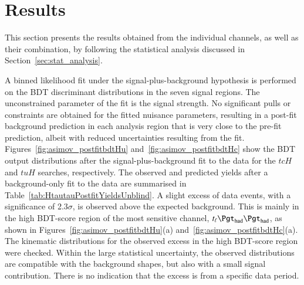 \section{Results}
\label{sec:result}

This section presents the results obtained from the individual channels, as well as their combination,
by following the statistical analysis discussed in Section~\ref{sec:stat_analysis}.

A binned likelihood fit under the signal-plus-background hypothesis is performed on the BDT discriminant distributions in the seven 
signal regions. The unconstrained parameter of the fit is the signal strength.
No significant pulls or constraints are obtained for the fitted nuisance parameters, resulting in a post-fit background prediction in each analysis region that is
very close to the pre-fit prediction, albeit with reduced uncertainties
resulting from the fit.
Figures~\ref{fig:asimov_postfitbdtHu} and~\ref{fig:asimov_postfitbdtHc} show the BDT output distributions after the signal-plus-background fit to the 
data for the $tcH$ and $tuH$ searches, respectively.
The observed and predicted yields after a background-only fit to the data are summarised in Table~\ref{tab:HtautauPostfitYieldsUnblind}.
A slight excess of data events, with a significance of 2.3$\sigma$, is observed above the expected background. This is mainly in the high BDT-score region of the most sensitive channel, $t_{\ell}\thadhad$, as shown in Figures~\ref{fig:asimov_postfitbdtHu}(a) and~\ref{fig:asimov_postfitbdtHc}(a).
The kinematic distributions for the observed excess in
the high BDT-score region were checked. Within the large statistical uncertainty, the observed distributions are compatible with the background shapes, but also with a small signal contribution. There is no indication that the excess is from a specific data period.
